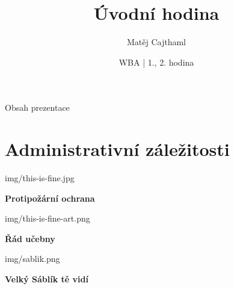 \documentclass[aspectratio=1610]{beamer}
\title{Úvodní hodina}
\date{WBA | 1., 2. hodina}
\author[Cajthaml]{Matěj Cajthaml}
\begin{document}
\begin{frame}
\titlepage
\end{frame}

\begin{frame}{Obsah prezentace}
    \begin{cardTiny}
        \begin{minipage}{\textwidth}
            \vspace{1ex}
            \tableofcontents
        \end{minipage}
    \end{cardTiny}
\end{frame}



\section{Administrativní záležitosti}

\begin{frameImg}{img/this-is-fine.jpg}
    \vspace*{60mm}
    \begin{cardTiny}
        \vspace*{\fill}
        \begin{center}
            \textbf{Protipožární ochrana}
        \end{center}
    \end{cardTiny}
\end{frameImg}

\begin{frameImg}[height]{img/this-is-fine-art.png}
    \vspace*{60mm}
    \begin{cardTiny}
        \vspace*{\fill}
        \begin{center}
            \textbf{Řád učebny}
        \end{center}
    \end{cardTiny}
\end{frameImg}

\begin{frameImg}[height]{img/sablik.png}
    \vspace*{60mm}
    \begin{cardTiny}
        \vspace*{\fill}
        \begin{center}
            \textbf{Velký Sáblík tě vidí}
        \end{center}
    \end{cardTiny}
\end{frameImg}
\end{document}
